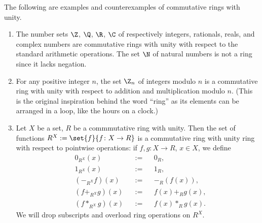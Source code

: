 \begin{example}
  The following are examples and counterexamples of commutative rings with
  unity.
  \begin{enumerate}
    \item
      The number sets $\Z$, $\Q$, $\R$, $\C$ of respectively integers,
      rationals, reals, and complex numbers are commutative rings with unity
      with respect to the standard arithmetic operations.
      The set $\N$ of natural numbers is not a ring since it lacks negation.
    \item
      For any positive integer $n$, the set $\Z_n$ of integers modulo $n$ is a
      commutative ring with unity with respect to addition and multiplication
      modulo $n$.
      (This is the original inspiration behind the word ``ring'' as its elements
      can be arranged in a loop, like the hours on a clock.)
    \item
      Let $X$ be a set, $R$ be a commmutative ring with unity.
      Then the set of functions $R^X := \set{f}{f \colon X \to R}$ is a
      commutative ring with unity ring with respect to pointwise operations:
      if $f, g \colon X \to R$, $x \in X$, we define
      \begin{subequations}
        \begin{alignat}{3}
          & 0_{R^X}(x) && := && 0_R, \\
          & 1_{R^X}(x) && := && 1_R, \\
          & (-_{R^X} f)(x) && := && -_R(f(x)), \\
          & (f +_{R^X} g)(x) && := && f(x) +_R g(x), \\
          & (f *_{R^X} g)(x) && := && f(x) *_R g(x).
        \end{alignat}
      \end{subequations}
      We will drop subscripts and overload ring operations on $R^X$.
  \end{enumerate}
\end{example}
